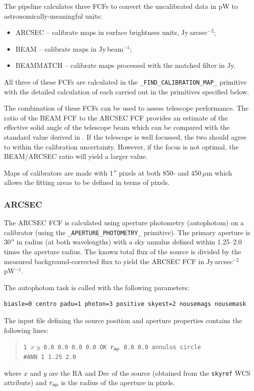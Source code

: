 \documentclass[twoside,11pt]{article}
\renewcommand{\_}{\texttt{\symbol{95}}}
\newcommand{\task}[1]{\textsf{#1}}
\begin{document}
The pipeline calculates three FCFs to convert the uncalibrated data in
pW to astronomically-meaningful units:
\begin{itemize}
\item ARCSEC -- calibrate maps in surface brightness units,
  Jy\,arcsec$^{-2}$;
\item BEAM -- calibrate maps in Jy\,beam$^{-1}$;
\item BEAMMATCH -- calibrate maps processed with the matched filter in
  Jy.
\end{itemize}
All three of these FCFs are calculated in the
\verb+_FIND_CALIBRATION_MAP_+ primitive with the detailed calculation
of each carried out in the primitives specified below.

The combination of these FCFs can be used to assess telescope
performance. The ratio of the BEAM FCF to the ARCSEC FCF provides an
estimate of the effective solid angle of the telescope beam which can
be compared with the standard value derived in
\cite{scuba2calpaper}. If the telescope is well focussed, the two
should agree to within the calibration uncertainty. However, if the
focus is not optimal, the BEAM/ARCSEC ratio will yield a larger value.

Maps of calibrators are made with 1$''$ pixels at both 850- and
450\,$\mu$m which allows the fitting areas to be defined in terms of pixels.

\subsubsection{ARCSEC}

The ARCSEC FCF is calculated using aperture photometry
(\task{autophotom}) on a calibrator (using the
\verb+_APERTURE_PHOTOMETRY_+ primitive). The primary aperture is
30$''$ in radius (at both wavelengths) with a sky annulus defined
within 1.25--2.0 times the aperture radius. The known total flux of
the source is divided by the measured background-corrected flux to
yield the ARCSEC FCF in Jy\,arcsec$^{-2}$\,pW$^{-1}$.

The \task{autophotom} task is called with the following parameters:
\begin{verbatim}
biasle=0 centro padu=1 photon=3 positive skyest=2 nousemags nousemask
\end{verbatim}
The input file defining the source position and aperture properties
contains the following lines:
\begin{quote}
\verb+1 +$x$ $y$\verb+ 0.0 0.0 0.0 0.0 OK +$r_{\rm ap}$\verb+ 0.0 0.0 annulus circle+\\
\verb+#ANN 1 1.25 2.0+
\end{quote}
where $x$ and $y$ are the RA and Dec of the source (obtained from the
\verb+skyref+ WCS attribute) and $r_{\rm ap}$ is the radius of the
aperture in pixels.
\end{document}
